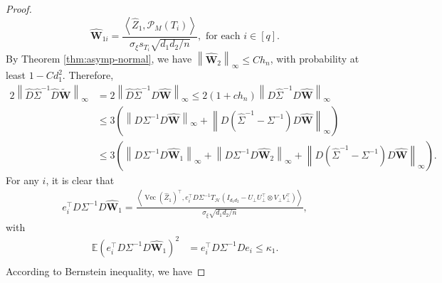 \documentclass[12pt]{article}
\newcommand{\norm}[1]{\left\lVert#1\right\rVert}
\newcommand{\E}{\mathbb{E}}
\newcommand{\cP}{\mathcal{P}}
\def\calH{{\mathcal H}}
\theoremstyle{plain}
\begin{document}
\begin{proof}
\begin{equation}\label{eq:noise-W-decomp}
    \widehat{\mathbf{W}}_{1i}= \frac{\left\langle \widehat{Z}_1, \cP_M(T_i) \right\rangle }{\sigma_\xi s_{T_i} \sqrt{d_1 d_2/n} }, \text{~for~each~} i\in[q].
\end{equation}
By Theorem \ref{thm:asymp-normal}, we have $\norm{\widehat{\mathbf{W}}_2}_\infty \le C h_n$, with probability at least $1-C d_1^2$. Therefore,
\begin{equation*}
    \begin{aligned}
      2\norm{\widehat{D} \widehat{\Sigma}^{-1}\widehat{D} \widetilde{\mathbf{W}}}_{\infty} & =2\norm{\widehat{D} \widehat{\Sigma}^{-1}{D} \widehat{\mathbf{W}}}_{\infty} \le 2(1+ch_n)\norm{{D} \widehat{\Sigma}^{-1}{D} \widehat{\mathbf{W}}}_{\infty} \\
      & \le 3 \left(\norm{{D} {\Sigma}^{-1}{D} \widehat{\mathbf{W}}}_{\infty} +\norm{{D} (\widehat{\Sigma}^{-1}-{\Sigma}^{-1}) {D} \widehat{\mathbf{W}}}_{\infty} \right)\\
      & \le 3\left( \norm{{D} {\Sigma}^{-1}{D} \widehat{\mathbf{W}}_1}_{\infty}+\norm{{D} {\Sigma}^{-1}{D} \widehat{\mathbf{W}}_2}_{\infty}+\norm{{D} (\widehat{\Sigma}^{-1}-{\Sigma}^{-1}) {D} \widehat{\mathbf{W}}}_{\infty} \right).
    \end{aligned}
\end{equation*}
For any $i$, it is clear that 
\begin{equation*}
    \begin{aligned}
      e_i^\top {D} {\Sigma}^{-1}{D} \widehat{\mathbf{W}}_1 = \frac{\left\langle \operatorname{Vec}(\widehat{Z}_1)^\top, e_i^\top {D} {\Sigma}^{-1}T_{\calH} (I_{d_1 d_2} - U_\perp U_\perp^\top \otimes V_\perp V_\perp^\top ) \right\rangle }{\sigma_\xi \sqrt{d_1 d_2/n} },
    \end{aligned}
\end{equation*}
with 
\begin{equation*}
    \begin{aligned}
      \E \left(e_i^\top {D} {\Sigma}^{-1}{D} \widehat{\mathbf{W}}_1 \right)^2 &= e_i^\top D \Sigma^{-1} D e_i\le \kappa_1. \\
    \end{aligned}
\end{equation*}
According to Bernstein inequality, we have


\end{proof}
\end{document}

